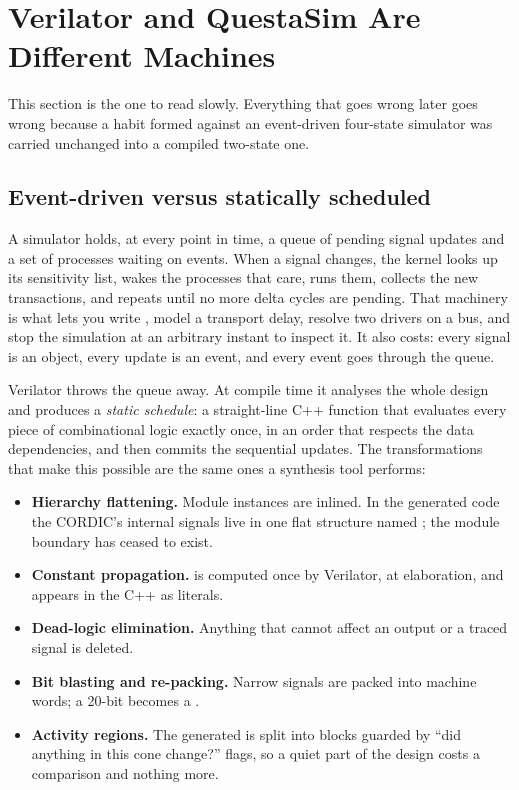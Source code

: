 \section{Verilator and QuestaSim Are Different Machines}
\label{sec:verilator:vs-questa}

This section is the one to read slowly. Everything that goes wrong later goes
wrong because a habit formed against an event-driven four-state simulator was
carried unchanged into a compiled two-state one.

\subsection{Event-driven versus statically scheduled}
\label{sec:verilator:sched}

A \VHDL{} simulator holds, at
every point in time, a queue of pending signal updates and a set of processes
waiting on events. When a signal changes, the kernel looks up its sensitivity
list, wakes the processes that care, runs them, collects the new transactions,
and repeats until no more delta cycles are pending. That machinery is what
lets you write , model a transport delay, resolve two
drivers on a bus, and stop the simulation at an arbitrary instant to inspect
it. It also costs: every signal is an object, every update is an event,
and every event goes through the queue.

Verilator throws the queue away. At compile time it analyses the whole design
and produces a \emph{static schedule}: a straight-line C++ function that
evaluates every piece of combinational logic exactly once, in an order that
respects the data dependencies, and then commits the sequential updates. The
transformations that make this possible are the same ones a synthesis tool
performs:

\begin{itemize}
  \item \textbf{Hierarchy flattening.} Module instances are inlined. In the
        generated code the CORDIC's internal signals live in one flat
        structure named ; the module boundary
        has ceased to exist.
  \item \textbf{Constant propagation.}  is computed once by
        Verilator, at elaboration, and appears in the C++ as literals.
  \item \textbf{Dead-logic elimination.} Anything that cannot affect an output
        or a traced signal is deleted.
  \item \textbf{Bit blasting and re-packing.} Narrow signals are packed into
        machine words; a 20-bit  becomes a .
  \item \textbf{Activity regions.} The generated  is split into
        blocks guarded by ``did anything in this cone change?'' flags, so a
        quiet part of the design costs a comparison and nothing more.
\end{itemize}

